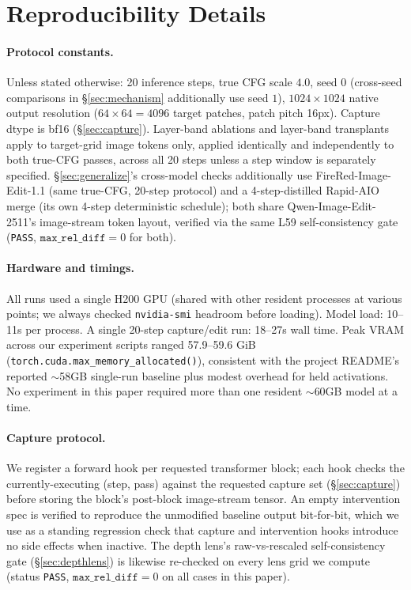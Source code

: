 \documentclass[10pt,twocolumn]{article}
\newcommand{\model}{Qwen-Image-Edit-2511}
\begin{document}



\appendix
\section{Reproducibility Details}\label{app:repro}

\paragraph{Protocol constants.} Unless stated otherwise: 20 inference
steps, true CFG scale $4.0$, seed $0$ (cross-seed comparisons in
\S\ref{sec:mechanism} additionally use seed $1$), $1024\times1024$
native output resolution ($64\times64{=}4096$ target patches, patch
pitch 16px). Capture dtype is bf16 (\S\ref{sec:capture}). Layer-band
ablations and layer-band transplants apply to target-grid image tokens
only, applied identically and independently to both true-CFG passes,
across all 20 steps unless a step window is separately specified.
\S\ref{sec:generalize}'s cross-model checks additionally use
FireRed-Image-Edit-1.1 (same true-CFG, 20-step protocol) and a
4-step-distilled Rapid-AIO merge (its own 4-step deterministic schedule);
both share \model{}'s image-stream token layout, verified via the same
L59 self-consistency gate (\texttt{PASS}, $\texttt{max\_rel\_diff}=0$ for
both).

\paragraph{Hardware and timings.} All runs used a single H200 GPU
(shared with other resident processes at various points; we always
checked \texttt{nvidia-smi} headroom before loading). Model load: 10--11s
per process. A single 20-step capture/edit run: 18--27s wall time.
Peak VRAM across our experiment scripts ranged 57.9--59.6 GiB
(\texttt{torch.cuda.max\_memory\_allocated()}), consistent with the
project README's reported $\sim$58GB single-run baseline plus modest
overhead for held activations. No experiment in this paper required
more than one resident $\sim$60GB model at a time.

\paragraph{Capture protocol.} We register a forward hook per requested
transformer block; each hook checks the currently-executing (step,
pass) against the requested capture set (\S\ref{sec:capture}) before
storing the block's post-block image-stream tensor. An empty
intervention spec is verified to reproduce the unmodified baseline
output bit-for-bit, which we use as a standing regression check that
capture and intervention hooks introduce no side effects when
inactive. The depth lens's raw-vs-rescaled self-consistency gate
(\S\ref{sec:depthlens}) is likewise re-checked on every lens grid we
compute (status \texttt{PASS}, $\texttt{max\_rel\_diff}=0$ on all cases
in this paper).
\end{document}
